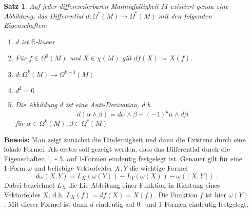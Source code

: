 \documentclass[12pt,a4paper]{article}
\def\R{\mathbb{R}}
\newtheorem{Satz}[Lemma]{Satz}
\def\proof{\noindent\textbf{Beweis:}\quad}
\begin{document}
\begin{Satz}
Auf jeder differenzierbaren Mannigfaltigkeit $M$ existiert genau eine Abbildung, das {\em Differential}
$d: \Omega^*(M) \rightarrow \Omega^*(M)$ mit den folgenden Eigenschaften:
\begin{enumerate}
\item
$d$ ist $\R$-linear
\item
F\"ur $f\in \Omega^0(M)$ und $X\in \chi(M)$ gilt $df(X) := X(f)$.
\item
$
d: \Omega^k(M) \rightarrow \Omega^{k+1}(M)
$
\item
$d^2 = 0$
\item
Die Abbildung $d$ ist eine Anti-Derivation, d.h.
$$
d(\alpha \wedge \beta) = d\alpha \wedge \beta +(-1)^k \alpha \wedge d\beta
$$
f\"ur $\alpha\in \Omega^k(M), \beta \in \Omega^*(M)$
\end{enumerate}
\end{Satz}
\proof
Man zeigt zun\"achst die Eindeutigkeit und dann die Existenz durch eine lokale Formel. Als erstes soll gezeigt
werden, dass das Differential durch die Eigenschaften 1. - 5. auf 1-Formen eindeutig festgelegt ist. Genauer
gilt f\"ur eine 1-Form $\omega$ und beliebige Vektorfelder $X,Y$ die wichtige Formel
\begin{equation}\label{fundamental}
d\omega(X,Y) = L_X(\omega (Y)) - L_Y(\omega(X)) - \omega([X, Y]) \ .
\end{equation}
Dabei bezeichnet $L_X$ die Lie-Ableitung einer Funktion in Richtung eines Vektorfeldes $X$, d.h.
$L_X(f)= df(X) = X(f)$. Die Funktion $f$ ist hier $\omega(Y)$. Mit dieser Formel ist dann $d$
eindeutig auf 0- und 1-Formen eindeutig festgelegt.

\medskip
\end{document}
